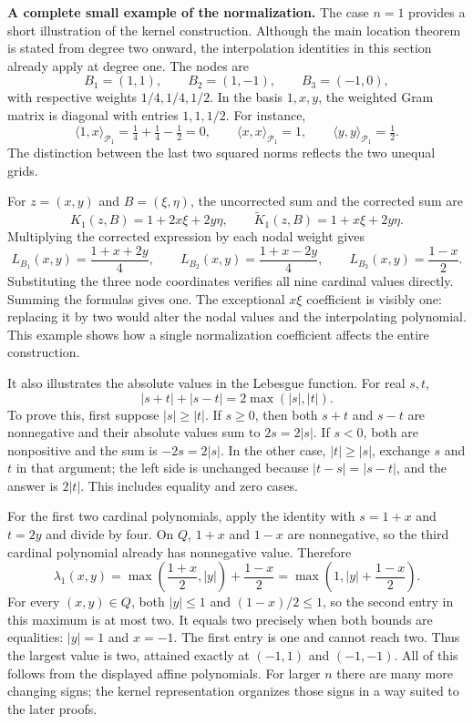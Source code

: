 \noindent\textbf{A complete small example of the normalization.}
The case $n=1$ provides a short illustration of the kernel construction.
Although the main location theorem is stated from degree two onward,
the interpolation identities in this section already apply at degree
one. The nodes are
\[
 B_1=(1,1),\qquad B_2=(1,-1),\qquad B_3=(-1,0),
\]
with respective weights $1/4,1/4,1/2$. In the basis $1,x,y$, the
weighted Gram matrix is diagonal with entries $1,1,1/2$. For instance,
\[
 \langle1,x\rangle_{\mathcal P_1}
       =\tfrac14+\tfrac14-\tfrac12=0,
 \qquad
 \langle x,x\rangle_{\mathcal P_1}=1,
 \qquad
 \langle y,y\rangle_{\mathcal P_1}=\tfrac12.
\]
The distinction between the last two squared norms reflects the two
unequal grids.

For $z=(x,y)$ and $B=(\xi,\eta)$, the uncorrected sum and the
corrected sum are
\[
 K_1(z,B)=1+2x\xi+2y\eta,\qquad
 \widetilde K_1(z,B)=1+x\xi+2y\eta.
\]
Multiplying the corrected expression by each nodal weight gives
\[
 L_{B_1}(x,y)=\frac{1+x+2y}{4},\qquad
 L_{B_2}(x,y)=\frac{1+x-2y}{4},\qquad
 L_{B_3}(x,y)=\frac{1-x}{2}.
\]
Substituting the three node coordinates verifies all nine cardinal
values directly. Summing the formulas gives one. The exceptional
$x\xi$ coefficient is visibly one: replacing it by two would alter
the nodal values and the interpolating polynomial. This example shows
how a single normalization coefficient affects the entire construction.

It also illustrates the absolute values in the Lebesgue function.
For real $s,t$,
\[
 |s+t|+|s-t|=2\max(|s|,|t|).
\]
To prove this, first suppose $|s|\geq|t|$. If $s\geq0$, then both
$s+t$ and $s-t$ are nonnegative and their absolute values sum to
$2s=2|s|$. If $s<0$, both are nonpositive and the sum is $-2s=2|s|$.
In the other case, $|t|\geq|s|$, exchange $s$ and $t$ in that
argument; the left side is unchanged because $|t-s|=|s-t|$, and the
answer is $2|t|$. This includes equality and zero cases.

For the first two cardinal polynomials, apply the identity with
$s=1+x$ and $t=2y$ and divide by four. On $Q$, $1+x$ and $1-x$ are
nonnegative, so the third cardinal polynomial already has nonnegative
value. Therefore
\[
 \lambda_1(x,y)
 =\max\left(\frac{1+x}{2},|y|\right)+\frac{1-x}{2}
 =\max\left(1,|y|+\frac{1-x}{2}\right).
\]
For every $(x,y)\in Q$, both $|y|\leq1$ and $(1-x)/2\leq1$,
so the second entry in this maximum is at most two. It equals two
precisely when both bounds are equalities: $|y|=1$ and $x=-1$.
The first entry is one and cannot reach two. Thus the largest value
is two, attained exactly at $(-1,1)$ and $(-1,-1)$.
All of this follows from the displayed affine polynomials. For larger
$n$ there are many more changing signs; the kernel representation
organizes those signs in a way suited to the later proofs.

